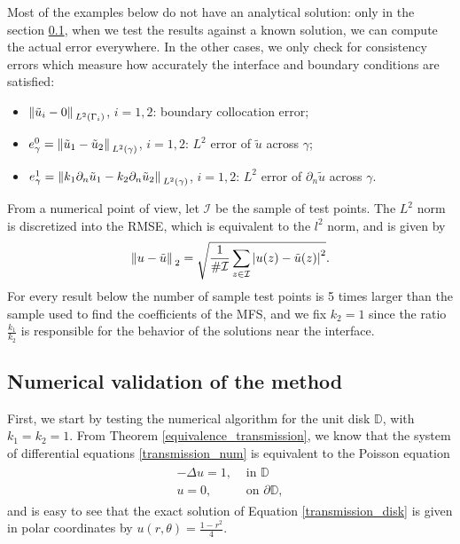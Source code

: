 Most of the examples below do not have an analytical solution: only in the section \ref{transmission_val_subsection}, when we test the results against a known solution, we can compute the actual error everywhere. In the other cases, we only check for consistency errors which measure how accurately the interface and boundary conditions are satisfied:
\begin{itemize}
    \item \(\norm*{\tilde{u}_i - 0}_{L^2(\Gamma_i)}\), \(i=1, 2\): boundary collocation error;
    \item \(e_\gamma^0 = \norm*{\tilde{u}_1 - \tilde{u}_2}_{L^2(\gamma)}\), \(i=1, 2\): \(L^2\) error of \(\tilde{u}\) across \(\gamma\);
    \item \(e_\gamma^1 = \norm*{k_1 \partial_n\tilde{u}_1 - k_2 \partial_n\tilde{u}_2}_{L^2(\gamma)}\), \(i=1, 2\): \(L^2\) error of \(\partial_n\tilde{u}\) across \(\gamma\).
\end{itemize}
From a numerical point of view, let \(\mathcal{I}\) be the sample of test points. The \(L^2\) norm is discretized into the \ac{RMSE}, which is equivalent to the \(l^2\) norm, and is given by
\[
    \norm*{u-\tilde{u}}_2= \sqrt{\frac{1}{\#\mathcal{I}} \sum_{z \in \mathcal{I}} \abs{u(z)-\tilde{u}(z)}^2}.
\]
For every result below the number of sample test points is 5 times larger than the sample used to find the coefficients of the \ac{MFS}, and we fix \(k_2=1\) since the ratio \(\frac{k_1}{k_2}\) is responsible for the behavior of the solutions near the interface.

\subsection{Numerical validation of the method}\label{transmission_val_subsection}

First, we start by testing the numerical algorithm for the unit disk \(\mathbb{D}\), with \(k_1=k_2=1\). From Theorem \ref{equivalence_transmission}, we know that the system of differential equations \eqref{transmission_num} is equivalent to the Poisson equation
\begin{align}\label{transmission_disk}
    \begin{split}
        -\Delta u = 1, & \text{ in } \mathbb{D}\\
        u = 0, & \text{ on } \partial\mathbb{D},
    \end{split}
\end{align}
and is easy to see that the exact solution of Equation \eqref{transmission_disk} is given in polar coordinates by \(u(r, \theta) = \frac{1-r^2}{4}\).


